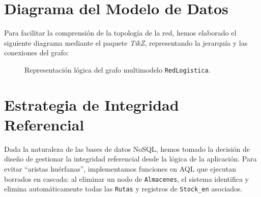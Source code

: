     \section{Diagrama del Modelo de Datos}
    Para facilitar la comprensión de la topología de la red, hemos elaborado el siguiente diagrama mediante el paquete \textit{TikZ}, representando la jerarquía y las conexiones del grafo:

    \begin{figure}[htp]
    \centering
    \caption{Representación lógica del grafo multimodelo \texttt{RedLogistica}.}
    \label{fig:diagrama_grafo}
    \end{figure}

    \section{Estrategia de Integridad Referencial}
    Dada la naturaleza de las bases de datos NoSQL, hemos tomado la decisión de diseño de gestionar la integridad referencial desde la lógica de la aplicación. Para evitar ``aristas huérfanas'', implementamos funciones en AQL que ejecutan borrados en cascada: al eliminar un nodo de \texttt{Almacenes}, el sistema identifica y elimina automáticamente todas las \texttt{Rutas} y registros de \texttt{Stock\_en} asociados.
